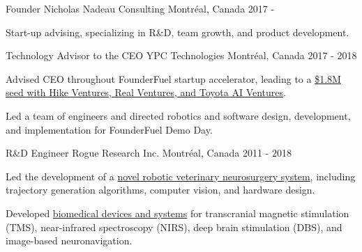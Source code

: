 \begin{cventries}
    \cventry
    {Founder}
    {Nicholas Nadeau Consulting}
    {Montréal, Canada}
    {2017 - }
    {
        \begin{cvitems}
            \item{Start-up advising, specializing in R\&D, team growth, and product development.}
        \end{cvitems}
    }

    \cventry
    {Technology Advisor to the CEO}
    {YPC Technologies}
    {Montréal, Canada}
    {2017 - 2018}
    {
        \begin{cvitems}
            \item{Advised CEO throughout FounderFuel startup accelerator, leading to a \href{https://www.ypc-technologies.com/ypc-seed-round-oct2020}{\$1.8M seed with Hike Ventures, Real Ventures, and Toyota AI Ventures}.}
            \item{Led a team of engineers and directed robotics and software design, development, and implementation for FounderFuel Demo Day.}
        \end{cvitems}
    }

    \cventry
    {R\&D Engineer}
    {Rogue Research Inc.}
    {Montréal, Canada}
    {2011 - 2018}
    {
        \begin{cvitems}
            \item{Led the development of a \href{https://www.nicholasnadeau.com/publication/nadeau-2017-characterization/?q=character}{novel robotic veterinary neurosurgery system}, including trajectory generation algorithms, computer vision, and hardware design.}
            \item{Developed \href{https://www.rogue-research.com/}{biomedical devices and systems} for transcranial magnetic stimulation (TMS), near-infrared spectroscopy (NIRS), deep brain stimulation (DBS), and image-based neuronavigation.}
        \end{cvitems}
    }

\end{cventries}
